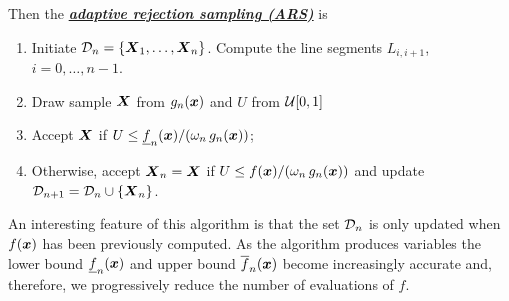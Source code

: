 \documentclass[11pt]{article}
\begin{document}
\begin{itemize}
Then the \underline{\emph{\textbf{adaptive rejection sampling (ARS)}}} is 
\begin{enumerate}
\item Initiate ${\mathcal D}_{n} = \left\{\boldsymbol{X}_1, \ldots, \boldsymbol{X}_{n}\right\}$. Compute the line segments $L_{i,i+1}$, $i=0,\ldots, n-1$.

\item Draw sample $\boldsymbol{X}$ from $g_{n}(\boldsymbol{x})$ and $U$ from ${\mathcal U}[0,1]$

\item Accept $\boldsymbol{X}$ if $U\le \underline{f}_n(\boldsymbol{x})/(\omega_{n}\,g_{n}(\boldsymbol{x}))$;
\item Otherwise, accept $\boldsymbol{X}_{n}  = \boldsymbol{X}$ if $U\le f(\boldsymbol{x})/(\omega_{n}\,g_{n}(\boldsymbol{x}))$
      and update ${\mathcal D}_{n+1} = {\mathcal D}_{n} \cup \left\{\boldsymbol{X}_{n}\right\}$.
\end{enumerate}

An interesting feature of this algorithm is that the set ${\mathcal D}_{n}$ is only updated when $f(\boldsymbol{x})$ has been previously computed. As the algorithm produces variables the lower bound $\underline{f}_n(\boldsymbol{x})$ and upper bound $\overline{f}_n(\boldsymbol{x})$ become increasingly accurate and, therefore, we progressively reduce the number of evaluations of $f$.
\end{itemize}
\end{document}
